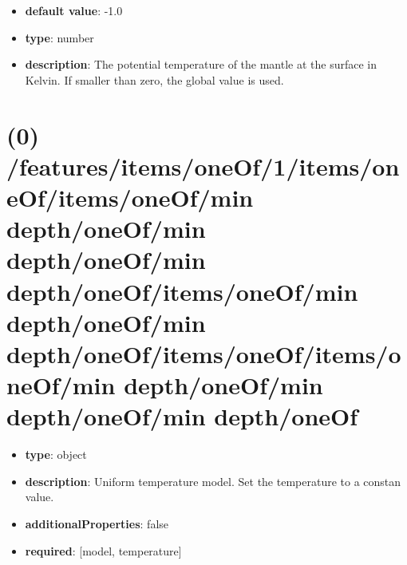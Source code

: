 \begin{itemize}[leftmargin=1em]\item {\bf default value}: -1.0
\item {\bf type}: number
\item {\bf description}: The potential temperature of the mantle at the surface in Kelvin. If smaller than zero, the global value is used.
\end{itemize}\section{(0) /features/items/oneOf/1/items/oneOf/items/oneOf/min depth/oneOf/min depth/oneOf/min depth/oneOf/items/oneOf/min depth/oneOf/min depth/oneOf/items/oneOf/items/oneOf/min depth/oneOf/min depth/oneOf/min depth/oneOf}
\begin{itemize}[leftmargin=0em]\item {\bf type}: object
\item {\bf description}: Uniform temperature model. Set the temperature to a constan value.
\item {\bf additionalProperties}: false
\item {\bf required}: [model, temperature]\end{itemize}
